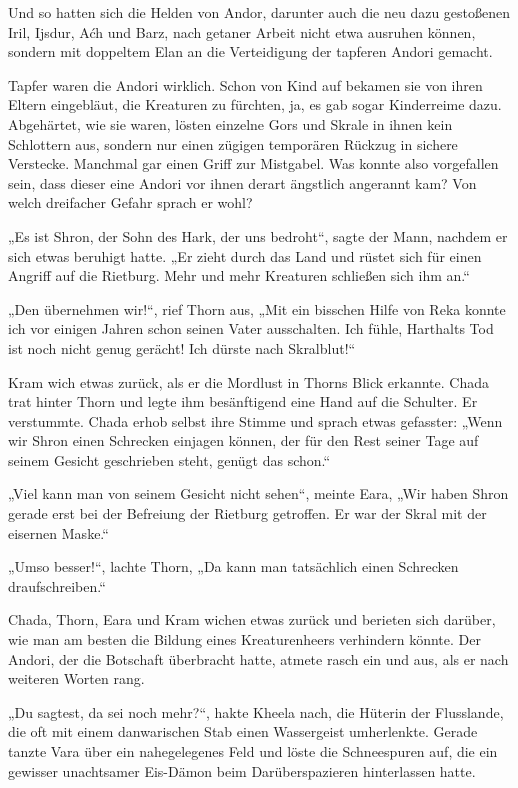 Und so hatten sich die Helden von Andor, darunter auch die neu dazu gestoßenen Iril, Ijsdur, Aćh und Barz, nach getaner Arbeit nicht etwa ausruhen können, sondern mit doppeltem Elan an die Verteidigung der tapferen Andori gemacht.

Tapfer waren die Andori wirklich. Schon von Kind auf bekamen sie von ihren Eltern eingebläut, die Kreaturen zu fürchten, ja, es gab sogar Kinderreime dazu. Abgehärtet, wie sie waren, lösten einzelne Gors und Skrale in ihnen kein Schlottern aus, sondern nur einen zügigen temporären Rückzug in sichere Verstecke. Manchmal gar einen Griff zur Mistgabel. Was konnte also vorgefallen sein, dass dieser eine Andori vor ihnen derart ängstlich angerannt kam? Von welch dreifacher Gefahr sprach er wohl?

„Es ist Shron, der Sohn des Hark, der uns bedroht“, sagte der Mann, nachdem er sich etwas beruhigt hatte. „Er zieht durch das Land und rüstet sich für einen Angriff auf die Rietburg. Mehr und mehr Kreaturen schließen sich ihm an.“

„Den übernehmen wir!“, rief Thorn aus, „Mit ein bisschen Hilfe von Reka konnte ich vor einigen Jahren schon seinen Vater ausschalten. Ich fühle, Harthalts Tod ist noch nicht genug gerächt! Ich dürste nach Skralblut!“

Kram wich etwas zurück, als er die Mordlust in Thorns Blick erkannte. Chada trat hinter Thorn und legte ihm besänftigend eine Hand auf die Schulter. Er verstummte. Chada erhob selbst ihre Stimme und sprach etwas gefasster: „Wenn wir Shron einen Schrecken einjagen können, der für den Rest seiner Tage auf seinem Gesicht geschrieben steht, genügt das schon.“

„Viel kann man von seinem Gesicht nicht sehen“, meinte Eara, „Wir haben Shron gerade erst bei der Befreiung der Rietburg getroffen. Er war der Skral mit der eisernen Maske.“

„Umso besser!“, lachte Thorn, „Da kann man tatsächlich einen Schrecken draufschreiben.“

Chada, Thorn, Eara und Kram wichen etwas zurück und berieten sich darüber, wie man am besten die Bildung eines Kreaturenheers verhindern könnte. Der Andori, der die Botschaft überbracht hatte, atmete rasch ein und aus, als er nach weiteren Worten rang.

„Du sagtest, da sei noch mehr?“, hakte Kheela nach, die Hüterin der Flusslande, die oft mit einem danwarischen Stab einen Wassergeist umherlenkte. Gerade tanzte Vara über ein nahegelegenes Feld und löste die Schneespuren auf, die ein gewisser unachtsamer Eis-Dämon beim Darüberspazieren hinterlassen hatte.

